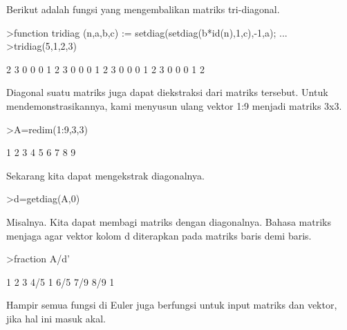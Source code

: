 \begin{eulernotebook}
\begin{eulercomment}
\begin{eulercomment}
\begin{eulercomment}
Berikut adalah fungsi yang mengembalikan matriks tri-diagonal.
\end{eulercomment}
\begin{eulerprompt}
>function tridiag (n,a,b,c) := setdiag(setdiag(b*id(n),1,c),-1,a); ...
>tridiag(5,1,2,3)
\end{eulerprompt}
\begin{euleroutput}
              2             3             0             0             0 
              1             2             3             0             0 
              0             1             2             3             0 
              0             0             1             2             3 
              0             0             0             1             2 
\end{euleroutput}
\begin{eulercomment}
Diagonal suatu matriks juga dapat diekstraksi dari matriks tersebut.
Untuk mendemonstrasikannya, kami menyusun ulang vektor 1:9 menjadi
matriks 3x3.
\end{eulercomment}
\begin{eulerprompt}
>A=redim(1:9,3,3)
\end{eulerprompt}
\begin{euleroutput}
              1             2             3 
              4             5             6 
              7             8             9 
\end{euleroutput}
\begin{eulercomment}
Sekarang kita dapat mengekstrak diagonalnya.
\end{eulercomment}
\begin{eulerprompt}
>d=getdiag(A,0)
\end{eulerprompt}
\begin{euleroutput}
  [1,  5,  9]
\end{euleroutput}
\begin{eulercomment}
Misalnya. Kita dapat membagi matriks dengan diagonalnya. Bahasa
matriks menjaga agar vektor kolom d diterapkan pada matriks baris demi
baris.
\end{eulercomment}
\begin{eulerprompt}
>fraction A/d'
\end{eulerprompt}
\begin{euleroutput}
          1         2         3 
        4/5         1       6/5 
        7/9       8/9         1 
        \\
\end{euleroutput}
\begin{eulercomment}
Hampir semua fungsi di Euler juga berfungsi untuk input matriks dan
vektor, jika hal ini masuk akal.


\end{eulercomment}
\end{eulercomment}
\end{eulercomment}
\end{eulernotebook}
